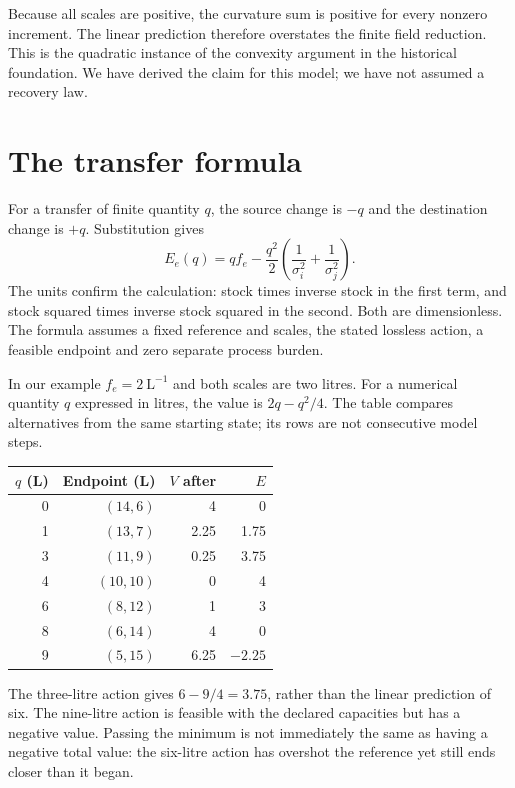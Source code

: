 Because all scales are positive, the curvature sum is positive for every nonzero increment. The linear prediction therefore overstates the finite field reduction. This is the quadratic instance of the convexity argument in the historical foundation. We have derived the claim for this model; we have not assumed a recovery law.

\section{The transfer formula}
For a transfer of finite quantity $q$, the source change is $-q$ and the destination change is $+q$. Substitution gives
\begin{equation}\label{eq:edge-finite}
 E_e(q)=qf_e-\frac{q^2}{2}
 \left(\frac1{\sigma_i^2}+\frac1{\sigma_j^2}\right).
\end{equation}
The units confirm the calculation: stock times inverse stock in the first term, and stock squared times inverse stock squared in the second. Both are dimensionless. The formula assumes a fixed reference and scales, the stated lossless action, a feasible endpoint and zero separate process burden.

In our example $f_e=2\ \mathrm{L}^{-1}$ and both scales are two litres. For a numerical quantity $q$ expressed in litres, the value is $2q-q^2/4$. The table compares alternatives from the same starting state; its rows are not consecutive model steps.

\begin{center}\small
\begin{tabular}{@{}rrrr@{}}
\toprule
$q$ (L) & Endpoint (L) & $V$ after & $E$\\
\midrule
0 & $(14,6)$ & 4 & 0\\
1 & $(13,7)$ & 2.25 & 1.75\\
3 & $(11,9)$ & 0.25 & 3.75\\
4 & $(10,10)$ & 0 & 4\\
6 & $(8,12)$ & 1 & 3\\
8 & $(6,14)$ & 4 & 0\\
9 & $(5,15)$ & 6.25 & $-2.25$\\
\bottomrule
\end{tabular}
\end{center}

The three-litre action gives $6-9/4=3.75$, rather than the linear prediction of six. The nine-litre action is feasible with the declared capacities but has a negative value. Passing the minimum is not immediately the same as having a negative total value: the six-litre action has overshot the reference yet still ends closer than it began.

